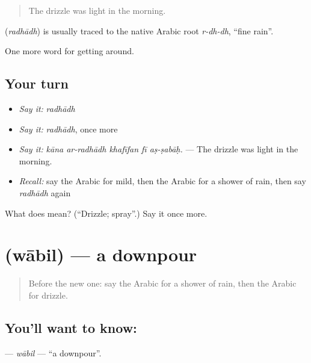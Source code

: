\begin{quote}
The drizzle was light in the morning.
\end{quote}

\begin{cousinweb}
\textbf{} (\emph{radhādh}) is usually traced to the native Arabic root \emph{r-dh-dh}, \textquotedblleft{}fine rain\textquotedblright{}.
\end{cousinweb}

\begin{grammarlens}[title={What you've built}]
One more word for getting around.
\end{grammarlens}

\subsection*{Your turn}
\begin{itemize}
\raggedright
  \item \emph{Say it:} \emph{radhādh}
  \item \emph{Say it:} \emph{radhādh}, once more
  \item \emph{Say it:} \emph{kāna ar-radhādh khafīfan fī aṣ-ṣabāḥ.} — The drizzle was light in the morning.
  \item \emph{Recall:} say the Arabic for mild, then the Arabic for a shower of rain, then say \emph{radhādh} again
\end{itemize}

\begin{tcolorbox}[breakable,colback=teal!4,colframe=teal!35!black,title={Before you move on}]
What does  mean? (\textquotedblleft{}Drizzle; spray\textquotedblright{}.) Say it once more.
\end{tcolorbox}
\section[\texorpdfstring{\ar{وابل} (wābil)}{وابل (wābil)}]{ (wābil) — a downpour}

\label{lesson:AR-C481-wabil}



\begin{quote}
Before the new one: say the Arabic for a shower of rain, then the Arabic for drizzle.
\end{quote}

\subsection*{You'll want to know: }
\textbf{} — \emph{wābil} — \textquotedblleft{}a downpour\textquotedblright{}.


